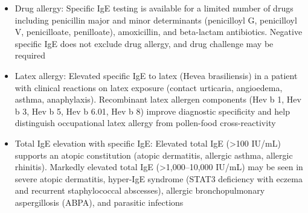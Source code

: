 \begin{itemize}
  \item Drug allergy: Specific IgE testing is available for a limited number of drugs including penicillin major and minor determinants (penicilloyl G, penicilloyl V, penicilloate, penilloate), amoxicillin, and beta-lactam antibiotics. Negative specific IgE does not exclude drug allergy, and drug challenge may be required
  \item Latex allergy: Elevated specific IgE to latex (Hevea brasiliensis) in a patient with clinical reactions on latex exposure (contact urticaria, angioedema, asthma, anaphylaxis). Recombinant latex allergen components (Hev b 1, Hev b 3, Hev b 5, Hev b 6.01, Hev b 8) improve diagnostic specificity and help distinguish occupational latex allergy from pollen-food cross-reactivity
  \item Total IgE elevation with specific IgE: Elevated total IgE (>100 IU/mL) supports an atopic constitution (atopic dermatitis, allergic asthma, allergic rhinitis). Markedly elevated total IgE (>1,000--10,000 IU/mL) may be seen in severe atopic dermatitis, hyper-IgE syndrome (STAT3 deficiency with eczema and recurrent staphylococcal abscesses), allergic bronchopulmonary aspergillosis (ABPA), and parasitic infections
\end{itemize}

